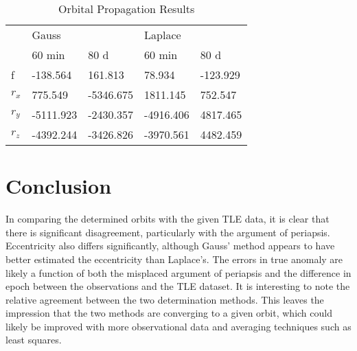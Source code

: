 \documentclass[11pt,twoside,letterpaper]{article}
\begin{document}
  \begin{table}
    \centering
    \begin{tabular}{lllll}
      & \multicolumn{2}{l}{Gauss} & \multicolumn{2}{l}{Laplace} \\
      & 60 min & 80 d & 60 min & 80 d \\
      \cline{2-5} \multicolumn{1}{l|}{f} & \multicolumn{1}{l|}{-138.564} &
                                                                           \multicolumn{1}{l|}{161.813} & \multicolumn{1}{l|}{78.934} & \multicolumn{1}{l|}{-123.929} \\
      \cline{2-5} \multicolumn{1}{l|}{$r_x$} & \multicolumn{1}{l|}{775.549} & \multicolumn{1}{l|}{-5346.675} & \multicolumn{1}{l|}{1811.145} & \multicolumn{1}{l|}{752.547} \\
      \cline{2-5} \multicolumn{1}{l|}{$r_y$} & \multicolumn{1}{l|}{-5111.923} &
                                                                                \multicolumn{1}{l|}{-2430.357} & \multicolumn{1}{l|}{-4916.406} & \multicolumn{1}{l|}{4817.465} \\
      \cline{2-5} \multicolumn{1}{l|}{$r_z$} & \multicolumn{1}{l|}{-4392.244} &
                                                                                \multicolumn{1}{l|}{-3426.826} & \multicolumn{1}{l|}{-3970.561} & \multicolumn{1}{l|}{4482.459} \\
      \cline{2-5} 
    \end{tabular}
    \caption{Orbital Propagation Results}
    \label{propagationResults}
  \end{table}
  
  \section{Conclusion}
  In comparing the determined orbits with the given TLE data, it is
  clear that there is significant disagreement, particularly with the
  argument of periapsis. Eccentricity also differs significantly,
  although Gauss' method appears to have better estimated the
  eccentricity than Laplace's. The errors in true anomaly are likely a
  function of both the misplaced argument of periapsis and the
  difference in epoch between the observations and the TLE dataset. It
  is interesting to note the relative agreement between the two
  determination methods. This leaves the impression that the two
  methods are converging to a given orbit, which could likely be
  improved with more observational data and averaging techniques such
  as least squares.
\end{document}

